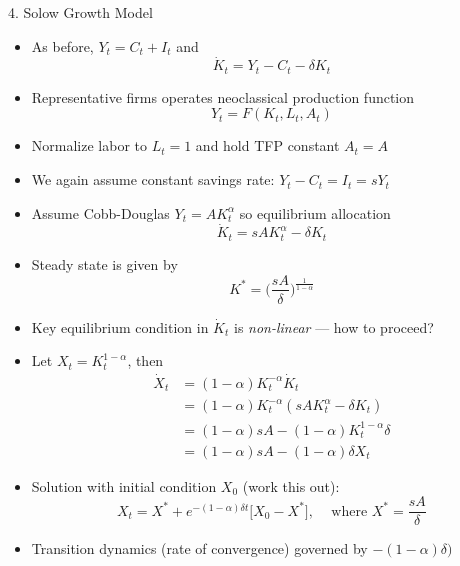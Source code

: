\documentclass[10pt]{beamer}
\begin{document}
\begin{frame}{4. Solow Growth Model}
\begin{itemize}
\item As before, $Y_t = C_t + I_t$ and 
\begin{equation*}
	\dot K_t = Y_t - C_t - \delta K_t
\end{equation*}

\item Representative firms operates neoclassical production function
\begin{equation*}
	Y_t = F(K_t, L_t, A_t)
\end{equation*}

\item Normalize labor to $L_t = 1$ and hold TFP constant $A_t = A$

\item We again assume constant savings rate: $Y_t - C_t = I_t = s Y_t$

\item Assume Cobb-Douglas $Y_t = A K_t^\alpha$ so equilibrium allocation
\begin{equation*}
	\dot K_t = s A K_t^\alpha - \delta K_t
\end{equation*}
\end{itemize}
\end{frame}


\begin{frame}{}
\begin{itemize}
\item Steady state is given by
\begin{equation*}
	K^* = \bigg( \frac{sA}{\delta} \bigg)^\frac{1}{1-\alpha}
\end{equation*}

\item Key equilibrium condition in $\dot K_t$ is \textit{non-linear} --- how to proceed?

\item Let $X_t = K_t^{1-\alpha}$, then 
\begin{align*}
	\dot X_t &= (1-\alpha) K_t^{-\alpha} \dot K_t  \\
	&= (1-\alpha) K_t^{-\alpha} ( s A K_t^\alpha - \delta K_t )  \\
	&= (1-\alpha) s A - (1-\alpha) K_t^{1-\alpha} \delta \\
	&= (1-\alpha) s A - (1-\alpha) \delta X_t
\end{align*}

\item Solution with initial condition $X_0$ (work this out):
\begin{equation*}
	X_t = X^* + e^{-(1-\alpha) \delta t} \bigg[ X_0 - X^* \bigg], \;\;\; \text{ where } X^* = \frac{sA}{\delta}
\end{equation*}

\item Transition dynamics (rate of convergence) governed by $-(1-\alpha) \delta)$

\end{itemize}
\end{frame}
\end{document}
